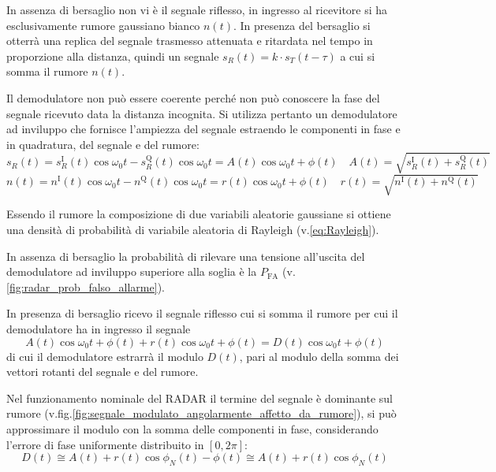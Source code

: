 In assenza di bersaglio non vi è il segnale riflesso, in ingresso al ricevitore si ha esclusivamente rumore gaussiano bianco $n(t)$.
In presenza del bersaglio si otterrà una replica del segnale trasmesso attenuata e ritardata nel tempo in proporzione alla distanza, quindi un segnale $s_R(t)=k\cdot s_T(t-\tau)$ a cui si somma il rumore $n(t)$.

Il demodulatore non può essere coerente perché non può conoscere la fase del segnale ricevuto data la distanza incognita. Si utilizza pertanto un demodulatore ad inviluppo che fornisce l'ampiezza del segnale estraendo le componenti in fase e in quadratura, del segnale e del rumore:
\begin{equation}
s_R(t)=s_R^\text{I}(t)\cos{\omega_0 t}-s_R^\text{Q}(t)\cos{\omega_0 t}=A(t)\cos{\omega_0 t+\phi(t)}\quad A(t)=\sqrt{s_R^\text{I}(t)+s_R^\text{Q}(t)}
\end{equation}
\begin{equation}
n(t)=n^\text{I}(t)\cos{\omega_0 t}-n^\text{Q}(t)\cos{\omega_0 t}=r(t)\cos{\omega_0 t+\phi(t)}\quad r(t)=\sqrt{n^\text{I}(t)+n^\text{Q}(t)}
\end{equation}

Essendo il rumore la composizione di due variabili aleatorie gaussiane si ottiene una densità di probabilità di variabile aleatoria di Rayleigh (v.\ref{eq:Rayleigh}).

In assenza di bersaglio la probabilità di rilevare una tensione all'uscita del demodulatore ad inviluppo superiore alla soglia è la  $P_\text{FA}$ (v.\ref{fig:radar_prob_falso_allarme}).

In presenza di bersaglio ricevo il segnale riflesso cui si somma il rumore per cui il demodulatore ha in ingresso il segnale
\begin{equation}
A(t)\cos{\omega_0 t+\phi(t)}+r(t)\cos{\omega_0 t+\phi(t)}=D(t)\cos{\omega_0 t+\phi(t)}
\end{equation}
di cui il demodulatore estrarrà il modulo $D(t)$, pari al modulo della somma dei vettori rotanti del segnale e del rumore.

Nel funzionamento nominale del \ac{RADAR} il termine del segnale è dominante sul rumore (v.fig.\ref{fig:segnale_modulato_angolarmente_affetto_da_rumore}), si può approssimare il modulo con la somma delle componenti in fase, considerando l'errore di fase uniformente distribuito in $[0,2\pi]$:
\[D(t)\cong A(t)+r(t)\cos{\phi_N(t)-\phi(t)}\cong A(t)+r(t)\cos{\phi_N(t)}\]

